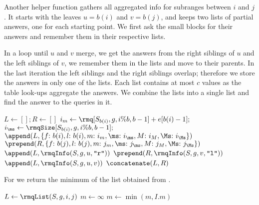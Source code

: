 Another helper function \rmqList{} gathers all aggregated info for subranges between $i$ and $j$.
It starts with the leaves $u = b(i)$ and $v = b(j)$, and keeps two lists of partial answers, one for each starting point.
We first ask the small blocks for their answers and remember them in their respective lists.

In a loop until $u$ and $v$ merge, we get the answers from the right siblings of $u$ and the left siblings of $v$, we remember them in the lists and move to their parents.
In the last iteration the left siblings and the right siblings overlap; therefore we store the answers in only one of the lists.
Each list contains at most $c$ values as the table look-ups aggregate the answers.
We combine the lists into a single list and find the answer to the queries in it.

\begin{algorithm}
\begin{algorithmic}
 
	\State $L \gets []; R \gets []$ 
	\State $i_m \gets \rmq[S_{b(i)}, g, i \% b, b - 1] + e[b(i) - 1];$ 
	\State $i_{\ms} \gets \rmqSize[S_{b(i)}, g, i \% b, b - 1];$ 
	\State $\append(L, \{\struct{f}{b(i)}, \struct{l}{b(i)}, \struct{m}{i_m}, \struct{\ms}{i_{\ms}}, \struct{M}{i_M}, \struct{\Ms}{i_{\Ms}} \})$ 
	\State $\prepend(R, \{\struct{f}{b(j)}, \struct{l}{b(j)}, \struct{m}{j_m}, \struct{\ms}{j_{\ms}}, \struct{M}{j_M}, \struct{\Ms}{j_{\Ms}} \})$ 
	 
		\State $\append(L, \rmqInfo(S, g, u, \str{r}))$
		\State $\prepend(R, \rmqInfo(S, g, v, \str{l}))$
	\EndWhile
	\State $\append(L, \rmqInfo(S, g, u, v))$ 
	\State $\concatenate(L, R)$
	\State {}
\EndFunction
\end{algorithmic}
\end{algorithm}

\bigbreak

For \rmq{} we return the minimum of the list obtained from \rmqList{}.

\begin{algorithm}
\begin{algorithmic}
		\State {}
	\Else
		\State $L \gets \rmqList(S, g, i, j)$
		\State $m \gets \infty$
			\State $m \gets \min(m, I.m)$
		\EndFor
		\State {}
	\EndIf
\EndFunction
\end{algorithmic}
\end{algorithm}

